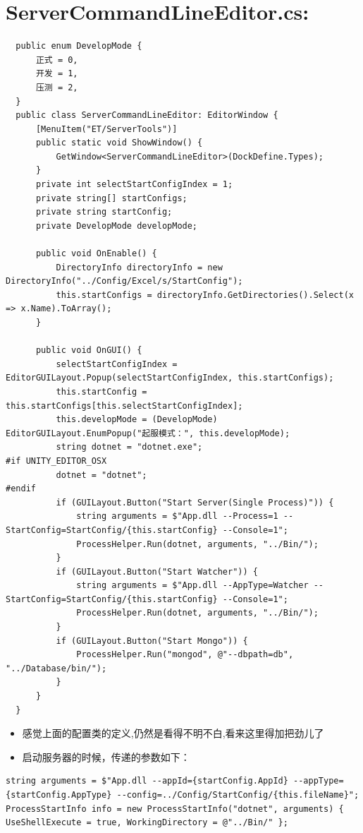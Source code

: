\documentclass[9pt, b5paper]{article}
\begin{document}
\section{ServerCommandLineEditor.cs:}
\label{sec-13}
\begin{verbatim}
  public enum DevelopMode {
      正式 = 0,
      开发 = 1,
      压测 = 2,
  }
  public class ServerCommandLineEditor: EditorWindow {
      [MenuItem("ET/ServerTools")]
      public static void ShowWindow() {
          GetWindow<ServerCommandLineEditor>(DockDefine.Types);
      }
      private int selectStartConfigIndex = 1;
      private string[] startConfigs;
      private string startConfig;
      private DevelopMode developMode;

      public void OnEnable() {
          DirectoryInfo directoryInfo = new DirectoryInfo("../Config/Excel/s/StartConfig");
          this.startConfigs = directoryInfo.GetDirectories().Select(x => x.Name).ToArray();
      }

      public void OnGUI() {
          selectStartConfigIndex = EditorGUILayout.Popup(selectStartConfigIndex, this.startConfigs);
          this.startConfig = this.startConfigs[this.selectStartConfigIndex];
          this.developMode = (DevelopMode) EditorGUILayout.EnumPopup("起服模式：", this.developMode);
          string dotnet = "dotnet.exe";
#if UNITY_EDITOR_OSX
          dotnet = "dotnet";
#endif
          if (GUILayout.Button("Start Server(Single Process)")) {
              string arguments = $"App.dll --Process=1 --StartConfig=StartConfig/{this.startConfig} --Console=1";
              ProcessHelper.Run(dotnet, arguments, "../Bin/");
          }
          if (GUILayout.Button("Start Watcher")) {
              string arguments = $"App.dll --AppType=Watcher --StartConfig=StartConfig/{this.startConfig} --Console=1";
              ProcessHelper.Run(dotnet, arguments, "../Bin/");
          }
          if (GUILayout.Button("Start Mongo")) {
              ProcessHelper.Run("mongod", @"--dbpath=db", "../Database/bin/");
          }
      }
  }
\end{verbatim}
\begin{itemize}
\item 感觉上面的配置类的定义,仍然是看得不明不白,看来这里得加把劲儿了
\item 启动服务器的时候，传递的参数如下：
\end{itemize}
\begin{verbatim}
string arguments = $"App.dll --appId={startConfig.AppId} --appType={startConfig.AppType} --config=../Config/StartConfig/{this.fileName}";
ProcessStartInfo info = new ProcessStartInfo("dotnet", arguments) { UseShellExecute = true, WorkingDirectory = @"../Bin/" };
\end{verbatim}
\end{document}
